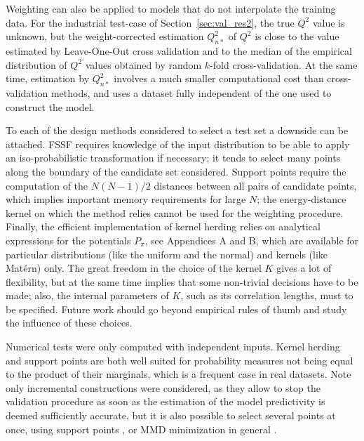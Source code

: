 Weighting can also be applied to models that do not interpolate the training data. 
For the industrial test-case of Section~\ref{sec:val_res2}, the true $Q^2$ value is unknown, but the weight-corrected estimation $Q_{n*}^2$ of $Q^2$ is close to the value estimated by Leave-One-Out cross validation and to the median of the empirical distribution of $Q^2$ values obtained by random $k$-fold cross-validation. 
At the same time, estimation by $Q_{n*}^2$ involves a much smaller computational cost than cross-validation methods, and uses a dataset fully independent of the one used to construct the model. 

To each of the design methods considered to select a test set a downside can be attached. 
FSSF requires knowledge of the input distribution to be able to apply an iso-probabilistic transformation if necessary; it tends to select many points along the boundary of the candidate set considered. 
Support points require the computation of the $N(N-1)/2$ distances between all pairs of candidate points, which implies important memory requirements for large $N$; the energy-distance kernel on which the method relies cannot be used for the weighting procedure. 
Finally, the efficient implementation of kernel herding relies on analytical expressions for the potentials $P_{\pi}$, see Appendices A and B, which are available for particular distributions (like the uniform and the normal) and kernels (like Matérn) only. 
The great freedom in the choice of the kernel $K$ gives a lot of flexibility, but at the same time implies that some non-trivial decisions have to be made; also, the internal parameters of $K$, such as its correlation lengths, must to be specified. 
Future work should go beyond empirical rules of thumb and study the influence of these choices.

Numerical tests were only computed with independent inputs. 
Kernel herding and support points are both well suited for probability measures not being equal to the product of their marginals, which is a frequent case in real datasets. 
Note only incremental constructions were considered, as they allow to stop the validation procedure as soon as the estimation of the model predictivity is deemed sufficiently accurate, but it is also possible to select several points at once, using support points \citep{mak_joseph_2018}, or MMD minimization in general \citep{teymur_gorham_2021}. 

